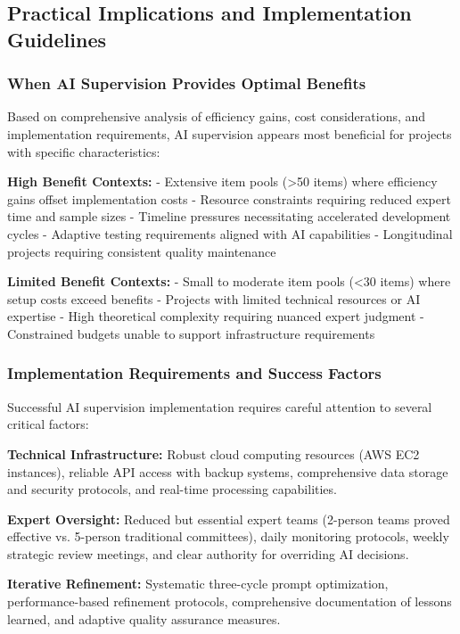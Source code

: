 \documentclass[12pt,a4paper]{article}
\begin{document}
\subsection{Practical Implications and Implementation Guidelines}

\subsubsection{When AI Supervision Provides Optimal Benefits}

Based on comprehensive analysis of efficiency gains, cost considerations, and implementation requirements, AI supervision appears most beneficial for projects with specific characteristics:

\textbf{High Benefit Contexts:}
- Extensive item pools (>50 items) where efficiency gains offset implementation costs
- Resource constraints requiring reduced expert time and sample sizes
- Timeline pressures necessitating accelerated development cycles
- Adaptive testing requirements aligned with AI capabilities
- Longitudinal projects requiring consistent quality maintenance

\textbf{Limited Benefit Contexts:}
- Small to moderate item pools (<30 items) where setup costs exceed benefits
- Projects with limited technical resources or AI expertise
- High theoretical complexity requiring nuanced expert judgment
- Constrained budgets unable to support infrastructure requirements

\subsubsection{Implementation Requirements and Success Factors}

Successful AI supervision implementation requires careful attention to several critical factors:

\textbf{Technical Infrastructure:} Robust cloud computing resources (AWS EC2 instances), reliable API access with backup systems, comprehensive data storage and security protocols, and real-time processing capabilities.

\textbf{Expert Oversight:} Reduced but essential expert teams (2-person teams proved effective vs. 5-person traditional committees), daily monitoring protocols, weekly strategic review meetings, and clear authority for overriding AI decisions.

\textbf{Iterative Refinement:} Systematic three-cycle prompt optimization, performance-based refinement protocols, comprehensive documentation of lessons learned, and adaptive quality assurance measures.
\end{document}
